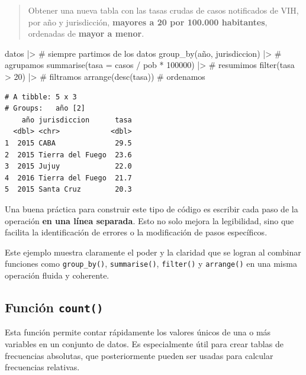 \documentclass[
  spanish,
  letterpaper,
  DIV=11,
  numbers=noendperiod]{scrreprt}
\newenvironment{Shaded}{\begin{snugshade}}{\end{snugshade}}
\newcommand{\AttributeTok}[1]{\textcolor[rgb]{0.40,0.45,0.13}{#1}}
\newcommand{\CommentTok}[1]{\textcolor[rgb]{0.37,0.37,0.37}{#1}}
\newcommand{\DecValTok}[1]{\textcolor[rgb]{0.68,0.00,0.00}{#1}}
\newcommand{\FunctionTok}[1]{\textcolor[rgb]{0.28,0.35,0.67}{#1}}
\newcommand{\NormalTok}[1]{\textcolor[rgb]{0.00,0.23,0.31}{#1}}
\newcommand{\SpecialCharTok}[1]{\textcolor[rgb]{0.37,0.37,0.37}{#1}}
\begin{document}
\begin{quote}
Obtener una nueva tabla con las tasas crudas de casos notificados de
VIH, por año y jurisdicción, \textbf{mayores a 20 por 100.000
habitantes}, ordenadas de \textbf{mayor a menor}.
\end{quote}

\begin{Shaded}
\begin{Highlighting}[]
\NormalTok{datos }\SpecialCharTok{|\textgreater{}} \CommentTok{\# siempre partimos de los datos}
  \FunctionTok{group\_by}\NormalTok{(año, jurisdiccion) }\SpecialCharTok{|\textgreater{}} \CommentTok{\# agrupamos}
  \FunctionTok{summarise}\NormalTok{(}\AttributeTok{tasa =}\NormalTok{ casos }\SpecialCharTok{/}\NormalTok{ pob }\SpecialCharTok{*} \DecValTok{100000}\NormalTok{) }\SpecialCharTok{|\textgreater{}} \CommentTok{\# resumimos}
  \FunctionTok{filter}\NormalTok{(tasa }\SpecialCharTok{\textgreater{}} \DecValTok{20}\NormalTok{) }\SpecialCharTok{|\textgreater{}} \CommentTok{\# filtramos}
  \FunctionTok{arrange}\NormalTok{(}\FunctionTok{desc}\NormalTok{(tasa)) }\CommentTok{\# ordenamos}
\end{Highlighting}
\end{Shaded}

\begin{verbatim}
# A tibble: 5 x 3
# Groups:   año [2]
    año jurisdiccion      tasa
  <dbl> <chr>            <dbl>
1  2015 CABA              29.5
2  2015 Tierra del Fuego  23.6
3  2015 Jujuy             22.0
4  2016 Tierra del Fuego  21.7
5  2015 Santa Cruz        20.3
\end{verbatim}

Una buena práctica para construir este tipo de código es escribir cada
paso de la operación \textbf{en una línea separada}. Esto no solo mejora
la legibilidad, sino que facilita la identificación de errores o la
modificación de pasos específicos.

Este ejemplo muestra claramente el poder y la claridad que se logran al
combinar funciones como \texttt{group\_by()}, \texttt{summarise()},
\texttt{filter()} y \texttt{arrange()} en una misma operación fluida y
coherente.

\subsection{\texorpdfstring{Función
\texttt{count()}}{Función count()}}\label{funciuxf3n-count}

Esta función permite contar rápidamente los valores únicos de una o más
variables en un conjunto de datos. Es especialmente útil para crear
tablas de frecuencias absolutas, que posteriormente pueden ser usadas
para calcular frecuencias relativas.
\end{document}
